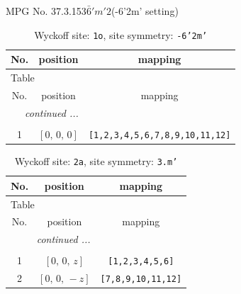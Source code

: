 \documentclass[fleqn,8pt]{jsarticle}
\begin{document}
\setcounter{MaxMatrixCols}{32}

\renewcommand{\tablename}{Table~}
\renewcommand{\figurename}{Figure~}
\begin{center}
\LARGE
MPG No. 37.3.153\quad$\bar{6}'m'2$\quad(-6'2m' setting)
\end{center}
\renewcommand{\arraystretch}{1.2}
\begin{longtable}{ccc}
\caption{Wyckoff site: {\tt 1o}, site symmetry: {\tt -6'2m'}}
 \\
 \hline \hline
No. & position & mapping \\ \hline \endfirsthead

\multicolumn{2}{l}{\tablename\ \thetable{}} \\
 \hline \hline
No. & position & mapping \\ \hline \endhead

 \hline \hline
\multicolumn{2}{r}{\footnotesize\it continued ...} \\ \endfoot

 \hline \hline
\multicolumn{2}{r}{} \\ \endlastfoot

1 & $\left[ 0,\, 0,\, 0 \right]$ & {\tt [1,2,3,4,5,6,7,8,9,10,11,12]} \\
\end{longtable}
\renewcommand{\arraystretch}{1.2}
\begin{longtable}{ccc}
\caption{Wyckoff site: {\tt 2a}, site symmetry: {\tt 3.m'}}
 \\
 \hline \hline
No. & position & mapping \\ \hline \endfirsthead

\multicolumn{2}{l}{\tablename\ \thetable{}} \\
 \hline \hline
No. & position & mapping \\ \hline \endhead

 \hline \hline
\multicolumn{2}{r}{\footnotesize\it continued ...} \\ \endfoot

 \hline \hline
\multicolumn{2}{r}{} \\ \endlastfoot

1 & $\left[ 0,\, 0,\, z \right]$ & {\tt [1,2,3,4,5,6]} \\ \hline
2 & $\left[ 0,\, 0,\, - z \right]$ & {\tt [7,8,9,10,11,12]} \\
\end{longtable}
\renewcommand{\arraystretch}{1.2}
\end{document}

